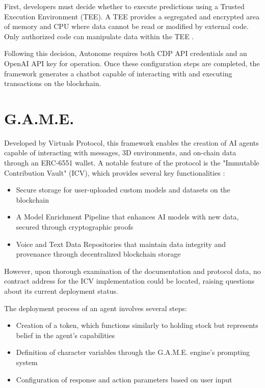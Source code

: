 \documentclass[fleqn,10pt]{olplainarticle}
\begin{document}
First, developers must decide whether to execute predictions using a Trusted Execution Environment (TEE). A TEE provides a segregated and encrypted area of memory and CPU where data cannot be read or modified by external code. Only authorized code can manipulate data within the TEE \cite{Microsoft_tee_2023}. 

Following this decision, Autonome requires both CDP API credentials and an OpenAI API key for operation. Once these configuration steps are completed, the framework generates a chatbot capable of interacting with and executing transactions on the blockchain.

\section{G.A.M.E.}
Developed by Virtuals Protocol, this framework enables the creation of AI agents capable of interacting with messages, 3D environments, and on-chain data through an ERC-6551 wallet. A notable feature of the protocol is the "Immutable Contribution Vault" (ICV), which provides several key functionalities \cite{noauthor_virtuals_nodate}:
\begin{itemize}[noitemsep]
	\item Secure storage for user-uploaded custom models and datasets on the blockchain
	\item A Model Enrichment Pipeline that enhances AI models with new data, secured through cryptographic proofs
	\item Voice and Text Data Repositories that maintain data integrity and provenance through decentralized blockchain storage
\end{itemize}

However, upon thorough examination of the documentation and protocol data, no contract address for the ICV implementation could be located, raising questions about its current deployment status.

The deployment process of an agent involves several steps:
\begin{itemize}[noitemsep]
	\item Creation of a token, which functions similarly to holding stock but represents belief in the agent's capabilities
	\item Definition of character variables through the G.A.M.E. engine's prompting system
	\item Configuration of response and action parameters based on user input
\end{itemize}
\end{document}
